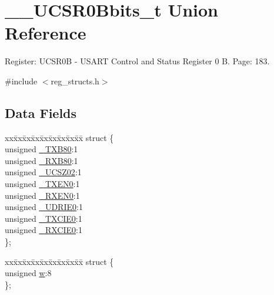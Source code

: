 \hypertarget{union_____u_c_s_r0_bbits__t}{\section{\+\_\+\+\_\+\+U\+C\+S\+R0\+Bbits\+\_\+t Union Reference}
\label{union_____u_c_s_r0_bbits__t}
}


Register\+: U\+C\+S\+R0\+B -\/ U\+S\+A\+R\+T Control and Status Register 0 B. Page\+: 183.  




{\ttfamily \#include $<$reg\+\_\+structs.\+h$>$}

\subsection*{Data Fields}
\begin{DoxyCompactItemize}
\item 
\begin{tabbing}
xx\=xx\=xx\=xx\=xx\=xx\=xx\=xx\=xx\=\kill
struct \{\\
\>unsigned \hyperlink{union_____u_c_s_r0_bbits__t_a9a2ffda0c9c2404974d068080ba82186}{\_TXB80}:1\\
\>unsigned \hyperlink{union_____u_c_s_r0_bbits__t_a98719da01be606bad49b3796a6ac4880}{\_RXB80}:1\\
\>unsigned \hyperlink{union_____u_c_s_r0_bbits__t_a8eae807a40cd6b9e43d820b05fabf876}{\_UCSZ02}:1\\
\>unsigned \hyperlink{union_____u_c_s_r0_bbits__t_a2b29e2bd43ab54feed67248adf954847}{\_TXEN0}:1\\
\>unsigned \hyperlink{union_____u_c_s_r0_bbits__t_a9bfde5cd22b6df97082d8678c2b7a200}{\_RXEN0}:1\\
\>unsigned \hyperlink{union_____u_c_s_r0_bbits__t_a2216a495afc28a49bea6d4a9db762f82}{\_UDRIE0}:1\\
\>unsigned \hyperlink{union_____u_c_s_r0_bbits__t_acc4eb2cb2de1e5cd5033cfdfa9580b7d}{\_TXCIE0}:1\\
\>unsigned \hyperlink{union_____u_c_s_r0_bbits__t_a0d5eb83523ba002e49816db517b4505e}{\_RXCIE0}:1\\
\}; \\

\end{tabbing}\item 
\begin{tabbing}
xx\=xx\=xx\=xx\=xx\=xx\=xx\=xx\=xx\=\kill
struct \{\\
\>unsigned \hyperlink{union_____u_c_s_r0_bbits__t_a1a781c79ede013888d206fdb353b4984}{w}:8\\
\}; \\

\end{tabbing}\end{DoxyCompactItemize}


